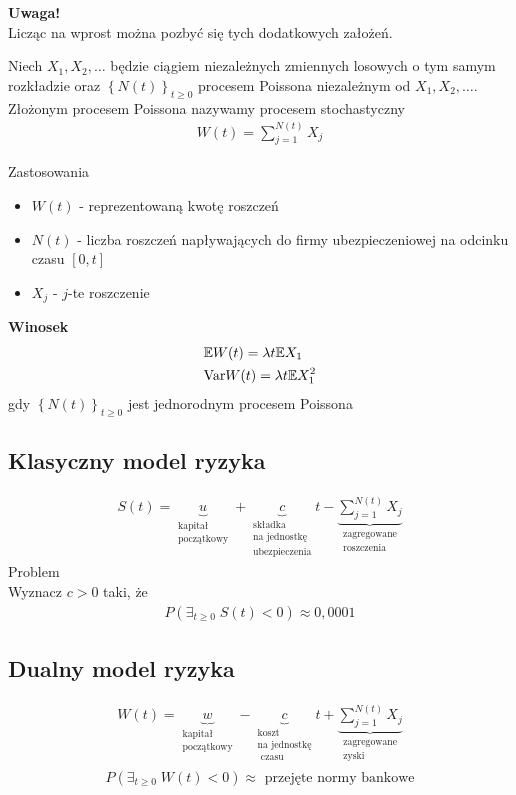 \textbf{Uwaga!}\\
Licząc na wprost można pozbyć się tych dodatkowych założeń.
\begin{defi}
Niech $ X_1,X_2,\dots  $ będzie ciągiem niezależnych zmiennych  losowych o tym samym rozkładzie oraz $ \left\{N(t)\right\}_{t\ge 0} $ procesem Poissona niezależnym od $ X_1,X_2,\dots  $. Złożonym procesem Poissona nazywamy procesem stochastyczny
\begin{gather*}
W(t)=\sum_{j=1}^{N(t)}X_j
\end{gather*}
\end{defi}
Zastosowania
\begin{itemize}
\item $ W(t) $ - reprezentowaną kwotę roszczeń
\item $ N(t) $ - liczba roszczeń napływających do firmy ubezpieczeniowej na odcinku czasu $ [0,t] $
\item $ X_j $ - $ j $-te roszczenie
\end{itemize}
\textbf{Winosek}
\begin{align*}
&\mathbb E W(t)=\lambda t\mathbb E X_1\\
&\text{Var} W(t)=\lambda t\mathbb E X_1^2
\end{align*}
gdy $ \left\{N(t)\right\}_{t\ge 0} $ jest jednorodnym procesem Poissona
\subsection{Klasyczny model ryzyka}
\begin{gather*}
S(t)=
\underbrace{u}_{\substack{\text{kapitał}\\\text{początkowy}}}
+\underbrace{c}_{\substack{\text{składka}\\\text{na jednostkę}\\\text{ubezpieczenia}}}
t-
\underbrace{\sum_{j=1}^{N(t)}X_j}_{\substack{\text{zagregowane}\\\text{roszczenia}}}
\end{gather*}
Problem\\
Wyznacz $ c>0 $ taki, że
\begin{gather*}
P\left(\exists_{t\ge0}\;S(t)<0\right)\approx0,0001
\end{gather*}
\subsection{Dualny model ryzyka}
\begin{gather*}
W(t)=\underbrace{w}_{\substack{\text{kapitał}\\\text{początkowy}}}-
\underbrace{c}_{\substack{\text{koszt}\\\text{na jednostkę}\\\text{ czasu}}}t+
\underbrace{\sum_{j=1}^{N(t)}X_j}_{\substack{\text{zagregowane}\\\text{zyski}}}
\end{gather*}
\begin{gather*}
P\left(\exists_{t\ge0}\;W(t)<0\right)\approx\text{ przejęte normy bankowe}
\end{gather*}
